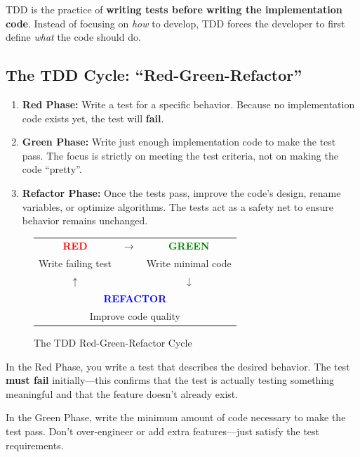 \documentclass[11pt,a4paper]{article}
\begin{document}
TDD is the practice of \textbf{writing tests before writing the implementation code}. Instead of focusing on \textit{how} to develop, TDD forces the developer to first define \textit{what} the code should do.

\subsection{The TDD Cycle: ``Red-Green-Refactor''}

\begin{enumerate}
    \item \textbf{Red Phase:} Write a test for a specific behavior. Because no implementation code exists yet, the test will \textbf{fail}.
    \item \textbf{Green Phase:} Write just enough implementation code to make the test pass. The focus is strictly on meeting the test criteria, not on making the code ``pretty''.
    \item \textbf{Refactor Phase:} Once the tests pass, improve the code's design, rename variables, or optimize algorithms. The tests act as a safety net to ensure behavior remains unchanged.
\end{enumerate}

\begin{figure}[h]
\centering
\begin{tabular}{|c|c|c|}
\hline
\textcolor{red}{\textbf{RED}} & $\rightarrow$ & \textcolor{green}{\textbf{GREEN}} \\
Write failing test & & Write minimal code \\
\hline
$\uparrow$ & & $\downarrow$ \\
\hline
\multicolumn{3}{|c|}{\textcolor{blue}{\textbf{REFACTOR}}} \\
\multicolumn{3}{|c|}{Improve code quality} \\
\hline
\end{tabular}
\caption{The TDD Red-Green-Refactor Cycle}
\end{figure}

\begin{redphasebox}
In the Red Phase, you write a test that describes the desired behavior. The test \textbf{must fail} initially---this confirms that the test is actually testing something meaningful and that the feature doesn't already exist.
\end{redphasebox}

\begin{greenphasebox}
In the Green Phase, write the minimum amount of code necessary to make the test pass. Don't over-engineer or add extra features---just satisfy the test requirements.
\end{greenphasebox}
\end{document}
